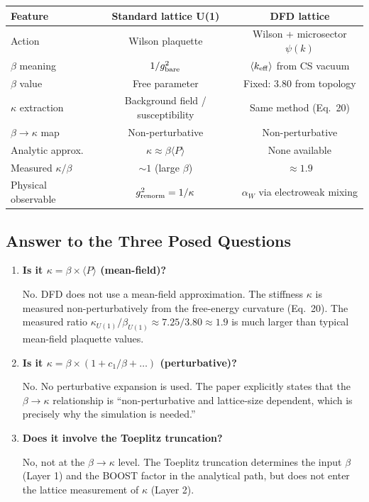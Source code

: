 \begin{center}
\renewcommand{\arraystretch}{1.3}
\begin{tabular}{lcc}
\toprule
\textbf{Feature} & \textbf{Standard lattice U(1)} & \textbf{DFD lattice} \\
\midrule
Action & Wilson plaquette & Wilson + microsector $\psi(k)$ \\
$\beta$ meaning & $1/g^2_{\rm bare}$ & $\langle k_{\rm eff} \rangle$ from CS vacuum \\
$\beta$ value & Free parameter & Fixed: $3.80$ from topology \\
$\kappa$ extraction & Background field / susceptibility & Same method (Eq.~20) \\
$\beta \to \kappa$ map & Non-perturbative & Non-perturbative \\
Analytic approx. & $\kappa \approx \beta \langle P \rangle$ & None available \\
Measured $\kappa/\beta$ & $\sim 1$ (large $\beta$) & $\approx 1.9$ \\
Physical observable & $g_{\rm renorm}^2 = 1/\kappa$ & $\alpha_W$ via electroweak mixing \\
\bottomrule
\end{tabular}
\end{center}

\subsection{Answer to the Three Posed Questions}

\begin{enumerate}
\item \textbf{Is it $\kappa = \beta \times \langle P \rangle$ (mean-field)?}

No. DFD does not use a mean-field approximation. The stiffness $\kappa$
is measured non-perturbatively from the free-energy curvature (Eq.~20).
The measured ratio $\kappa_{U(1)}/\beta_{U(1)} \approx 7.25/3.80 \approx 1.9$
is much larger than typical mean-field plaquette values.

\item \textbf{Is it $\kappa = \beta \times (1 + c_1/\beta + \ldots)$ (perturbative)?}

No. No perturbative expansion is used. The paper explicitly states that
the $\beta \to \kappa$ relationship is ``non-perturbative and lattice-size
dependent, which is precisely why the simulation is needed.''

\item \textbf{Does it involve the Toeplitz truncation?}

No, not at the $\beta \to \kappa$ level. The Toeplitz truncation determines
the input $\beta$ (Layer 1) and the BOOST factor in the analytical path,
but does not enter the lattice measurement of $\kappa$ (Layer 2).
\end{enumerate}

